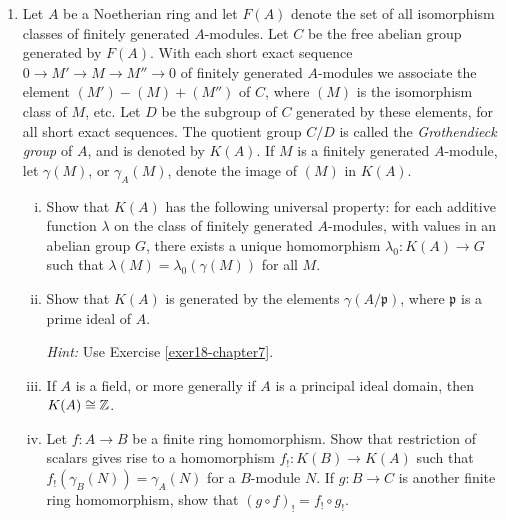 \begin{enumerate}
    \item \label{exer26-chapter7}Let $A$ be a Noetherian ring and let $F(A)$ denote the set of all isomorphism classes of finitely generated $A$-modules. Let $C$ be the free abelian group generated by $F(A)$. With each short exact sequence $0 \to M' \to M \to M'' \to 0$ of finitely generated $A$-modules we associate the element $(M') - (M) + (M'')$ of $C$, where $(M)$ is the isomorphism class of $M$, etc. Let $D$ be the subgroup of $C$ generated by these elements, for all short exact sequences. The quotient group $C/D$ is called the \emph{Grothendieck group} of $A$, and is denoted by $K(A)$. If $M$ is a finitely generated $A$-module, let $\gamma(M)$, or $\gamma_A(M)$, denote the image of $(M)$ in $K(A)$.
    \begin{enumerate}[i)]
        \item Show that $K(A)$ has the following universal property: for each additive function $\lambda$ on the class of finitely generated $A$-modules, with values in an abelian group $G$, there exists a unique homomorphism $\lambda_0 \colon K(A) \to G$ such that $\lambda(M) = \lambda_0(\gamma(M))$ for all $M$.
        \item Show that $K(A)$ is generated by the elements $\gamma(A/\mathfrak{p})$, where $\mathfrak{p}$ is a prime ideal of $A$. 
        
        \textit{Hint:} Use Exercise \ref{exer18-chapter7}.
        \item If $A$ is a field, or more generally if $A$ is a principal ideal domain, then $K(A) \cong \mathbb{Z}$.
        \item Let $f \colon A \to B$ be a finite ring homomorphism. Show that restriction of scalars gives rise to a homomorphism $f_! \colon K(B) \to K(A)$ such that $f_!(\gamma_B(N)) = \gamma_A(N)$ for a $B$-module $N$. If $g \colon B \to C$ is another finite ring homomorphism, show that $(g \circ f)_! = f_! \circ g_!$.
    \end{enumerate}


\end{enumerate}
